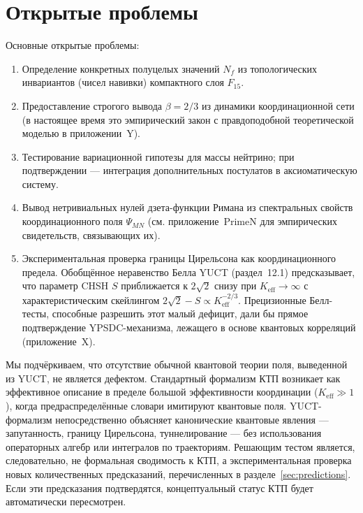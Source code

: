 \documentclass[12pt,a4paper]{article}
\theoremstyle{remark}
\begin{document}
	\section{Открытые проблемы}
	\label{sec:open}
	
	Основные открытые проблемы:
	
	\begin{enumerate}[label=(\roman*)]
		\item Определение конкретных полуцелых значений \(N_f\) из топологических инвариантов (чисел навивки) компактного слоя \(F_{15}\).
		\item Предоставление строгого вывода \(\beta = 2/3\) из динамики координационной сети (в настоящее время это эмпирический закон с правдоподобной теоретической моделью в приложении~Y).
		\item Тестирование вариационной гипотезы для массы нейтрино; при подтверждении --- интеграция дополнительных постулатов в аксиоматическую систему.
		\item Вывод нетривиальных нулей дзета-функции Римана из спектральных свойств координационного поля \(\Psi_{MN}\) (см. приложение~PrimeN для эмпирических свидетельств, связывающих их).
		\item Экспериментальная проверка границы Цирельсона как координационного предела. Обобщённое неравенство Белла YUCT (раздел~12.1) предсказывает, что параметр CHSH \(S\) приближается к \(2\sqrt{2}\) снизу при \(K_{\mathrm{eff}} \to \infty\) с характеристическим скейлингом \(2\sqrt{2} - S \propto K_{\mathrm{eff}}^{-2/3}\). Прецизионные Белл-тесты, способные разрешить этот малый дефицит, дали бы прямое подтверждение YPSDC-механизма, лежащего в основе квантовых корреляций (приложение~X).
	\end{enumerate}
	
	Мы подчёркиваем, что отсутствие обычной квантовой теории поля, выведенной из YUCT, не является дефектом. Стандартный формализм КТП возникает как эффективное описание в пределе большой эффективности координации (\(K_{\mathrm{eff}} \gg 1\)), когда предраспределённые словари имитируют квантовые поля. YUCT-формализм непосредственно объясняет канонические квантовые явления --- запутанность, границу Цирельсона, туннелирование --- без использования операторных алгебр или интегралов по траекториям. Решающим тестом является, следовательно, не формальная сводимость к КТП, а экспериментальная проверка новых количественных предсказаний, перечисленных в разделе~\ref{sec:predictions}. Если эти предсказания подтвердятся, концептуальный статус КТП будет автоматически пересмотрен.
	
\end{document}
